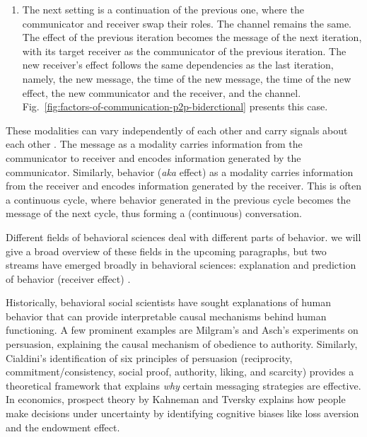 \begin{enumerate}
\item The next setting is a continuation of the previous one, where the communicator and receiver swap their roles. The channel remains the same. The effect of the previous iteration becomes the message of the next iteration, with its target receiver as the communicator of the previous iteration. The new receiver's effect follows the same dependencies as the last iteration, namely, the new message, the time of the new message, the time of the new effect, the new communicator and the receiver, and the channel. Fig.~\ref{fig:factors-of-communication-p2p-biderctional} presents this case.

\end{enumerate}



These modalities can vary independently of each other \cite{khandelwal2023large,khurana-etal-2023-synthesizing,si2023long,khurana2023behavior} and carry signals about each other \cite{khurana-etal-2023-synthesizing,bhattacharya2023video}. The message as a modality carries information from the communicator to receiver and encodes information generated by the communicator. Similarly, behavior (\textit{aka} effect) as a modality carries information from the receiver and encodes information generated by the receiver. This is often a continuous cycle, where behavior generated in the previous cycle becomes the message of the next cycle, thus forming a (continuous) conversation. 







Different fields of behavioral sciences deal with different parts of behavior. we will give a broad overview of these fields in the upcoming paragraphs, but two streams have emerged broadly in behavioral sciences: explanation and prediction of behavior (receiver effect) \cite{breiman2001statistical,hofman2017prediction,shmueli2010explain}. 



Historically, behavioral social scientists have sought explanations of human behavior that can provide interpretable causal mechanisms behind human functioning. A few prominent examples are Milgram's \cite{milgram1978obedience} and Asch's \cite{asch1948doctrine} experiments on persuasion, explaining the causal mechanism of obedience to authority. Similarly, Cialdini's \cite{cialdini2009influence} identification of six principles of persuasion (reciprocity, commitment/consistency, social proof, authority, liking, and scarcity) provides a theoretical framework that explains \textit{why} certain messaging strategies are effective. In economics, prospect theory by Kahneman and Tversky \cite{kahneman1979prospect} explains how people make decisions under uncertainty by identifying cognitive biases like loss aversion and the endowment effect.

